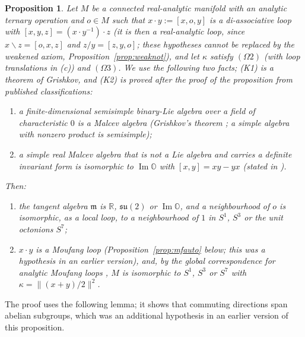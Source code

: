 \documentclass[11pt,reqno]{amsart}
\newtheorem{proposition}[theorem]{Proposition}
\theoremstyle{definition}
\theoremstyle{remark}
\numberwithin{equation}{section}
\newcommand{\R}{\mathbb{R}}
\newcommand{\su}{\mathfrak{su}}
\newcommand{\im}{\operatorname{Im}}
\newcommand{\hp}[3]{[#1,#2,#3]}
\begin{document}
\begin{proposition}\label{prop:moufangclass}
Let $M$ be a connected real-analytic manifold with an analytic ternary operation and $o\in M$ such that $x\cdot y:=\hp xoy$ is
a di-associative loop with $\hp xyz=(x\cdot y^{-1})\cdot z$ (it is then a real-analytic loop, since $x\backslash z=\hp oxz$ and $z/y=\hp zyo$;
these hypotheses cannot be replaced by the weakened
axiom, Proposition~\ref{prop:weaknot}), and let $\kappa$ satisfy $(\Omega2)$ (with loop
translations in (c)) and $(\Omega3)$.  We use the following two facts; (K1) is a theorem of Grishkov, and (K2) is
proved after the proof of the proposition from published classifications:
\begin{enumerate}[label=(K\arabic*),leftmargin=2.6em]
\item a finite-dimensional semisimple binary-Lie algebra over a field of characteristic $0$ is a Malcev algebra
(Grishkov's theorem \cite{Grishkov80}; a simple algebra with nonzero product is semisimple);
\item a simple real Malcev algebra that is not a Lie algebra and carries a definite invariant form is isomorphic to
$\im\mathbb O$ with $[x,y]=xy-yx$ (stated in \cite[\S2]{Loginov01}).
\end{enumerate}
Then:
\begin{enumerate}[label=(\roman*)]
\item the tangent algebra $\mathfrak m$ is $\R$, $\su(2)$ or $\im\mathbb O$, and a neighbourhood of $o$ is isomorphic, as a local loop, to a
neighbourhood of $1$ in $S^1$, $S^3$ or the unit octonions $S^7$;
\item $x\cdot y$ is a Moufang loop (Proposition~\ref{prop:mfauto} below; this was a hypothesis in an earlier version), and, by the
global correspondence for analytic Moufang loops \cite{Kerdman}, $M$ is isomorphic to $S^1$, $S^3$ or $S^7$ with
$\kappa=\lVert(x+y)/2\rVert^2$.
\end{enumerate}
\end{proposition}

The proof uses the following lemma; it shows that commuting directions span abelian subgroups, which was an additional hypothesis in an earlier version of this proposition.
\end{document}
